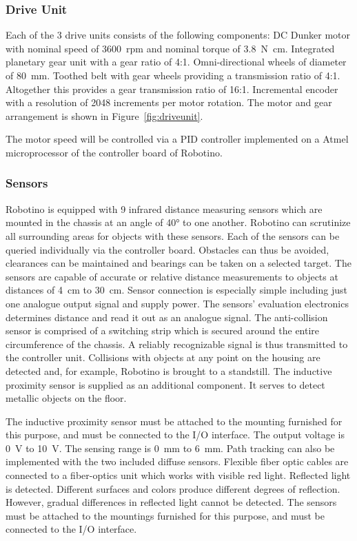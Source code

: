 \documentclass[12pt,twoside]{article}
\begin{document}
\begin{appendix}
\subsubsection{Drive Unit}
Each of the 3 drive units consists of the following components: DC
Dunker motor with nominal speed of \SI{3600}{rpm} and nominal torque
of \SI{3.8}{\newton\centi\metre}. Integrated planetary gear unit with
a gear ratio of 4:1. Omni-directional wheels of diameter of
\SI{80}{\milli\metre}. Toothed belt with gear wheels providing a
transmission ratio of 4:1. Altogether this provides a gear
transmission ratio of 16:1. Incremental encoder with a resolution of
2048 increments per motor rotation. The motor and gear arrangement is
shown in Figure~\ref{fig:driveunit}.

The motor speed will be controlled via a PID controller implemented on
a Atmel microprocessor of the controller board of Robotino.

\subsubsection{Sensors}
Robotino is equipped with 9 infrared distance measuring sensors which
are mounted in the chassis at an angle of \ang{40} to one
another. Robotino can scrutinize all surrounding areas for objects
with these sensors.  Each of the sensors can be queried individually
via the controller board. Obstacles can thus be avoided, clearances
can be maintained and bearings can be taken on a selected target. The
sensors are capable of accurate or relative distance measurements to
objects at distances of \SI{4}{\centi\metre} to
\SI{30}{\centi\metre}. Sensor connection is especially simple
including just one analogue output signal and supply power. The
sensors' evaluation electronics determines distance and read it out as
an analogue signal.  The anti-collision sensor is comprised of a
switching strip which is secured around the entire circumference of
the chassis. A reliably recognizable signal is thus transmitted to the
controller unit.  Collisions with objects at any point on the housing
are detected and, for example, Robotino is brought to a
standstill. The inductive proximity sensor is supplied as an
additional component. It serves to detect metallic objects on the
floor.

The inductive proximity sensor must be attached to the mounting
furnished for this purpose, and must be connected to the I/O
interface.  The output voltage is \SI{0}{\volt} to \SI{10}{\volt}. The
sensing range is \SI{0}{\milli\metre} to \SI{6}{\milli\metre}. Path
tracking can also be implemented with the two included diffuse
sensors.  Flexible fiber optic cables are connected to a fiber-optics
unit which works with visible red light. Reflected light is
detected. Different surfaces and colors produce different degrees of
reflection. However, gradual differences in reflected light cannot be
detected. The sensors must be attached to the mountings furnished for
this purpose, and must be connected to the I/O interface.


\end{appendix}
\end{document}
